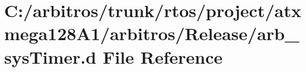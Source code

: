 \hypertarget{rtos_2project_2atxmega128_a1_2arbitros_2_release_2arb__sys_timer_8d}{\section{C\-:/arbitros/trunk/rtos/project/atxmega128\-A1/arbitros/\-Release/arb\-\_\-sys\-Timer.d File Reference}
\label{rtos_2project_2atxmega128_a1_2arbitros_2_release_2arb__sys_timer_8d}
}
